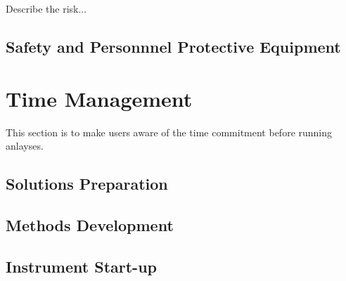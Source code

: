\documentclass[12pt]{../SOP4_alpha}\usepackage[]{graphicx}\usepackage[]{color}
\begin{document}
\NP Describe the risk...

\subsection{Safety and Personnnel Protective Equipment}







\section{Time Management}

\NP This section is to make users aware of the time commitment before running anlayses.

\subsection{Solutions Preparation}

\subsection{Methods Development}

\subsection{Instrument Start-up}
\end{document}
